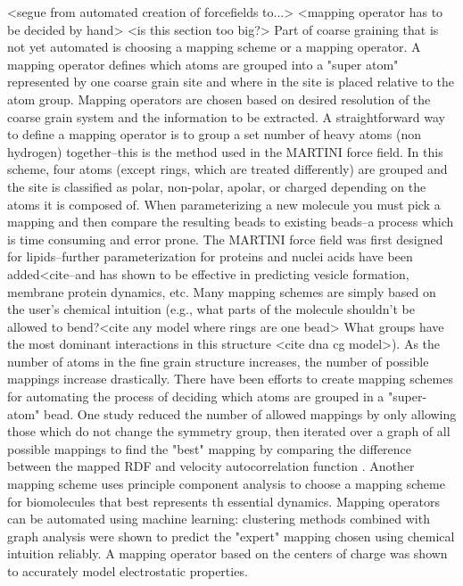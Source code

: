 <segue from automated creation of forcefields to...>
<mapping operator has to be decided by hand> <is this section too big?>
Part of coarse graining that is not yet automated is choosing a mapping scheme or a mapping operator.
A mapping operator defines which atoms are grouped into a "super atom" represented by one coarse grain site and where in the site is placed relative to the atom group.
Mapping operators are chosen based on desired resolution of the coarse grain system and the information to be extracted.
A straightforward way to define a mapping operator is to group a set number of heavy atoms (non hydrogen) together--this is the method used in the MARTINI force field\cite{Marrink2007}.
In this scheme, four atoms (except rings, which are treated differently) are grouped and the site is classified as polar, non-polar, apolar, or charged depending on the atoms it is composed of.
When parameterizing a new molecule you must pick a mapping and then compare the resulting beads to existing beads--a process which is time consuming and error prone\cite{http://www.cgmartini.nl/index.php/tutorials-general-introduction-gmx5/parametrzining-new-molecule-gmx5}.
The MARTINI force field was first designed for lipids--further parameterization for proteins and nuclei acids have been added<cite--and has shown to be effective in predicting vesicle formation, membrane protein dynamics, etc.
Many mapping schemes are simply based on the user's chemical intuition (e.g., what parts of the molecule shouldn't be allowed to bend?<cite any model where rings are one bead> What groups have the most dominant interactions in this structure <cite dna cg model>).
As the number of atoms in the fine grain structure increases, the number of possible mappings increase drastically.
There have been efforts to create mapping schemes for automating the process of deciding which atoms are grouped in a "super-atom" bead.
One study reduced the number of allowed mappings by only allowing those which do not change the symmetry group, then iterated over a graph of all possible mappings to find the "best" mapping by comparing the difference between the mapped RDF and velocity autocorrelation function \cite{Chakraborty2018a}.
Another mapping scheme uses principle component analysis to choose a mapping scheme for biomolecules that best represents th essential dynamics\cite{Zhang2008}.
Mapping operators can be automated using machine learning: clustering methods combined with graph analysis were shown to predict the "expert" mapping chosen using chemical intuition reliably\cite{Li2020}. 
A mapping operator based on the centers of charge was shown to accurately model electrostatic properties\cite{Cao2015a}.


